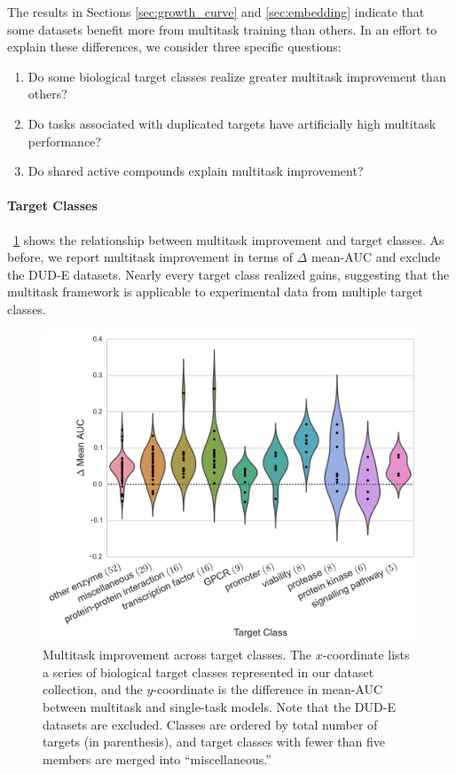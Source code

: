 The results in Sections \ref{sec:growth_curve} and \ref{sec:embedding}
indicate that some datasets benefit more from multitask training than
others. In an effort to explain these differences, we consider three
specific questions:
\begin{enumerate}
\itemsep0em
\item Do some biological target classes realize greater multitask
  improvement than others?
\item Do tasks associated with duplicated targets have artificially high
  multitask performance?
\item Do shared active compounds explain multitask improvement?
\end{enumerate}

\paragraph{Target Classes}

\figurename~\ref{fig:target_similarity} shows the relationship between
multitask improvement and target classes. As before, we report multitask
improvement in terms of $\Delta$ mean-AUC and exclude the DUD-E datasets.
Nearly every target class realized gains, suggesting that the
multitask framework is applicable to experimental data from multiple target
classes.

\begin{figure}[ht]
\centering
\includegraphics[width=0.9\linewidth]{Images/target_classes.png}
\caption{Multitask improvement across target classes. The $x$-coordinate
  lists a series of biological target classes represented in our dataset
  collection, and the $y$-coordinate is the difference in mean-AUC
  between multitask and single-task models. Note that the DUD-E datasets
  are excluded. Classes are ordered by total number of targets (in
  parenthesis), and target classes with fewer than five members are merged
  into ``miscellaneous.''}
\label{fig:target_similarity}
\end{figure}

